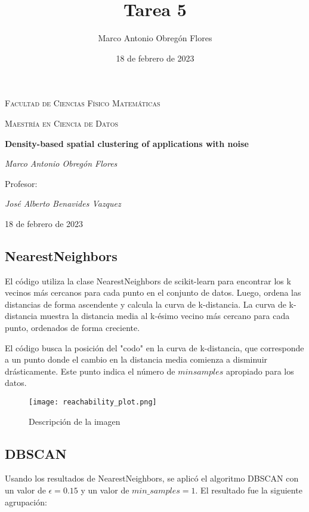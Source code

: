 \documentclass{article}
\title{Tarea 5}
\author{Marco Antonio Obregón Flores}
\date{18 de febrero de 2023}
\begin{document}
\begin{titlepage}
    \centering
    {\scshape\large Facultad de Ciencias Físico Matemáticas\par}
    {\scshape\large Maestría en Ciencia de Datos\par}
    \vspace{1cm}
    {\huge\bfseries Density-based spatial clustering of applications with noise\par}
    \vspace{2cm}
    {\Large\itshape Marco Antonio Obregón Flores\par}
    \vfill
    {\large Profesor:\par}
    {\Large\itshape José Alberto Benavides Vazquez\par}
    \vspace{1cm}
    {\large 18 de febrero de 2023\par}
\end{titlepage}

\subsection{NearestNeighbors}
\setlength{\parskip}{15pt}

El código utiliza la clase NearestNeighbors de scikit-learn para encontrar los k vecinos más cercanos para cada punto en el conjunto de datos. Luego, ordena las distancias de forma ascendente y calcula la curva de k-distancia. La curva de k-distancia muestra la distancia media al k-ésimo vecino más cercano para cada punto, ordenados de forma creciente.

El código busca la posición del "codo" en la curva de k-distancia, que corresponde a un punto donde el cambio en la distancia media comienza a disminuir drásticamente. Este punto indica el número de $min samples$
apropiado para los datos.

\begin{figure}[h]
\centering
\texttt{[image: reachability\_plot.png]}
\caption{Descripción de la imagen}
\label{fig:reachability_plot}
\end{figure}

\subsection{DBSCAN}

Usando los resultados de NearestNeighbors, se aplicó el algoritmo DBSCAN con un valor de $\epsilon = 0.15$ y un valor de $min\_samples = 1$. El resultado fue la siguiente agrupación:
\end{document}
